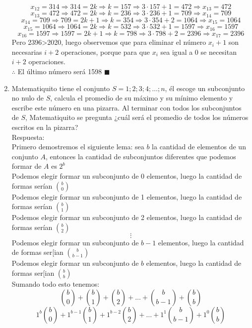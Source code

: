 \documentclass{book}
\begin{document}
\begin{enumerate}
			$$x_{12}=314\Rightarrow 314=2k\Rightarrow k=157\Rightarrow 3\cdot 157+1=472\Rightarrow x_{13}=472$$
			$$x_{13}=472\Rightarrow 472=2k\Rightarrow k=236\Rightarrow 3\cdot 236+1=709\Rightarrow x_{14}=709$$
			$$x_{14}=709\Rightarrow 709=2k+1\Rightarrow k=354\Rightarrow 3\cdot 354+2=1064\Rightarrow x_{15}=1064$$
			$$x_{15}=1064\Rightarrow 1064=2k\Rightarrow k=532\Rightarrow 3\cdot 532+1=1597\Rightarrow x_{16}=1597$$
			$$x_{16}=1597\Rightarrow 1597=2k+1\Rightarrow k=798\Rightarrow 3\cdot 798+2=2396\Rightarrow x_{17}=2396$$
			Pero 2396>2020, luego observemos que para eliminar el número $x_i+1$ son necesarias $i+2$ operaciones, porque para que $x_i$ sea igual a 0 se necesitan $i+2$ operaciones. \\
			$\therefore$ El último número será 1598 $\blacksquare$\\
			\item Matematiquito tiene el conjunto $S={1;2;3;4;\ldots ;n}$, él escoge un subconjunto no nulo de $S$, calcula el promedio de su máximo y su mínimo elemento y escribe este número en una pizarra. Al terminar con todos los subconjuntos de $S$, Matematiquito se pregunta ¿cuál será el promedio de todos los números escritos en la pizarra?\\
				Respuesta:\\
				Primero demostremos el siguiente lema: sea $b$ la cantidad de elementos de un conjunto $A$, entonces la cantidad de subconjuntos diferentes que podemos formar de $A$ es $2^b$\\
				Podemos elegir formar un subconjunto de 0 elementos, luego la cantidad de formas serían  $\displaystyle{b \choose 0}$\\
				Podemos elegir formar un subconjunto de 1 elementos, luego la cantidad de formas serían  $\displaystyle{b \choose 1}$\\
				Podemos elegir formar un subconjunto de 2 elementos, luego la cantidad de formas serían  $\displaystyle{b \choose 2}$\\
				$$\vdots$$
				Podemos elegir formar un subconjunto de $b-1$ elementos, luego la cantidad de formas ser[ian  $\displaystyle{b \choose {b-1}}$\\
				Podemos elegir formar un subconjunto de $b$ elementos, luego la cantidad de formas ser[ian  $\displaystyle{b \choose b}$\\
				Sumando todo esto tenemos:
				$${b \choose 0}+{b \choose 1}+{b \choose 2}+\ldots +{b \choose {b-1}}+{b \choose b}$$
				$$1^b {b \choose 0}+1^{b-1} {b \choose 1}+1^{b-2} {b \choose 2}+\ldots +1^1 {b \choose {b-1}}+1^0 {b \choose b}$$

\end{enumerate}
\end{document}
